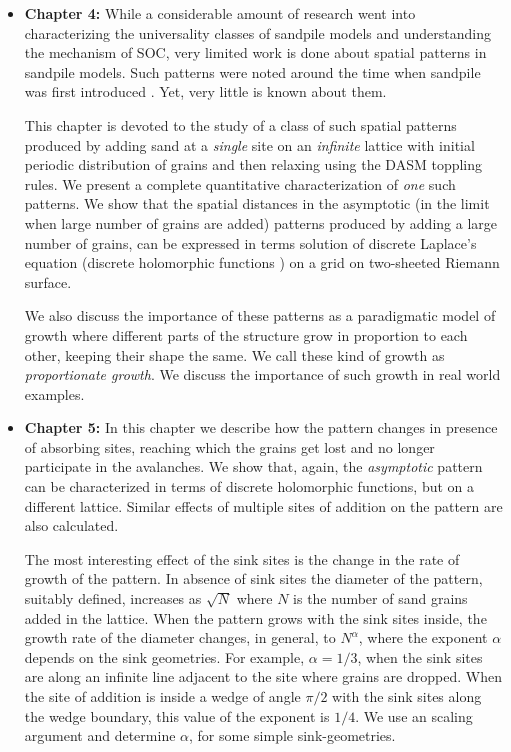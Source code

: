 \documentclass[11pt,a4paper]{book}
\begin{document}
\begin{itemize}
\item[]{\textbf{Chapter 4:} While a considerable amount of research
went into characterizing the universality classes of sandpile models
and understanding the mechanism of SOC, very limited work is done
about spatial patterns in sandpile models. Such patterns were noted around the
time when sandpile was first introduced \cite{liu}. Yet, very little
is known about them.

This chapter is devoted to the study of a class of such spatial patterns produced by
adding sand at a \textit{single} site on an \textit{infinite} lattice
with initial periodic distribution of grains and then
relaxing using the DASM toppling rules.
We present a complete quantitative characterization
of \textit{one} such patterns. We show that the spatial distances in the
asymptotic (in the limit when large number of grains are added)
patterns produced by adding a large number of grains, can be expressed
in terms solution of discrete Laplace's equation (discrete holomorphic
functions \cite{duffin,mercat,laszlo}) on a grid on
two-sheeted Riemann surface.

We also discuss the importance of these patterns as a paradigmatic
model of growth where different parts of the structure grow in
proportion to each other, keeping their shape the same. We call these
kind of growth as \textit{proportionate growth}. We discuss the
importance of such growth in real world examples.}

\item[]\textbf{Chapter 5:} In this chapter we describe how the
pattern changes in presence of absorbing sites, reaching which the
grains get lost and no longer participate in the avalanches. We show
that, again, the \textit{asymptotic} pattern can be characterized in
terms of discrete holomorphic functions, but on a different lattice.
Similar effects of multiple sites of addition on the pattern are
also calculated.

The most interesting effect of the sink sites is the
change in the rate of growth of the pattern. In absence of sink sites
the diameter of the pattern, suitably defined, increases as
$\sqrt{N}$ where $N$ is the number of sand grains added in the
lattice. When the pattern grows with the sink sites inside, the growth
rate of the diameter changes, in general, to $N^{\alpha}$, where
the exponent $\alpha$ depends on the sink geometries. For example,
$\alpha=1/3$, when the sink sites are along an infinite line adjacent
to the site where grains are dropped. When the site of addition is
inside a wedge of angle $\pi/2$ with the sink sites along the wedge
boundary, this value of the exponent is $1/4$. We use an scaling
argument and determine $\alpha$, for some simple sink-geometries.


\end{itemize}
\end{document}
